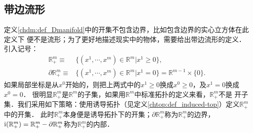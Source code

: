 
%


\subsection{带边流形}\label{chdf:sec_manifold-boundary}
定义\ref{chdm:def_Dmanifold}中的开集不包含边界，比如包含边界的实心立方体在此定义下
便不是流形；为了更好地描述现实中的物体，需要给出带边流形的定义．引入记号：
\begin{align}
    \mathbb{R}^m_{+} \equiv & \{(x^1,\cdots,x^m)\in \mathbb{R}^m | x^1 \geqslant 0 \}, \label{chdf:eqn_Rn+} \\
    \partial \mathbb{R}^m_{+} \equiv &\{(x^1,\cdots,x^m)\in \mathbb{R}^m | x^1 = 0 \}
    = \mathbb{R}^{m-1} \times \{0\} . \label{chdf:eqn_pRn+}
\end{align}
如果局部坐标是从$x^0$开始的，则把上两式中的$x^1 \geqslant 0$换成$x^0 \geqslant 0$，及$x^1 = 0$换成$x^0 = 0$．
很明显$\mathbb{R}^m_{+}$是$\mathbb{R}^m$的子集，如果用$\mathbb{R}^m$中标准拓扑的定义来看，$\mathbb{R}^m_{+}$不是
开子集．我们采用如下策略：使用诱导拓扑（见定义\ref{chtop:def_induced-top}）定义$\mathbb{R}^m_{+}$中的开集．
此时$\mathbb{R}^m_{+}$本身便是诱导拓扑下的开集；$\partial \mathbb{R}^m_{+}$称为$\mathbb{R}^m_{+}$的{\heiti 边界}，
${\rm i}(\mathbb{R}^m_{+})=\mathbb{R}^m_{+}- \partial \mathbb{R}^m_{+}$称为$\mathbb{R}^m_{+}$的{\heiti 内部}．

